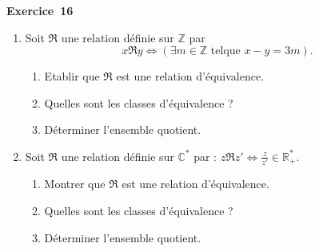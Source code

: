 \documentclass[11pt,a4paper]{article}
\begin{document}
	\medskip\noindent\textbf{\Large\color{bleu}Exercice~16}\nopagebreak
	\begin{enonce}
		\begin{enumerate}
			\item Soit $\mathfrak{R}$ une relation définie sur $\mathbb{Z}$ par
			\[
			x \mathfrak{R} y \Longleftrightarrow (\exists m \in \mathbb{Z} \text{ telque } x - y = 3m).
			\]
			\begin{enumerate}
				\item[a)] Etablir que $\mathfrak{R}$ est une relation d'équivalence.
				\item[b)] Quelles sont les classes d'équivalence ?
				\item[c)] Déterminer l'ensemble quotient.
			\end{enumerate}
			
			\item Soit $\mathfrak{R}$ une relation définie sur $\mathbb{C}^*$ par : $z \mathfrak{R} z' \Longleftrightarrow \frac{z}{z'} \in \mathbb{R}_+^*$.
			\begin{enumerate}
				\item[a)] Montrer que $\mathfrak{R}$ est une relation d'équivalence.
				\item[b)] Quelles sont les classes d'équivalence ?
				\item[c)] Déterminer l'ensemble quotient.
			\end{enumerate}
		\end{enumerate}
	\end{enonce}
\end{document}
